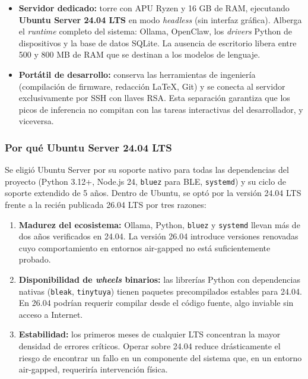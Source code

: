 \begin{itemize}
    \item \textbf{Servidor dedicado:} torre con APU Ryzen y 16 GB de RAM, ejecutando \textbf{Ubuntu Server 24.04 LTS} en modo \textit{headless} (sin interfaz gráfica). Alberga el \textit{runtime} completo del sistema: Ollama, OpenClaw, los \textit{drivers} Python de dispositivos y la base de datos SQLite. La ausencia de escritorio libera entre 500 y 800 MB de RAM que se destinan a los modelos de lenguaje.
    \item \textbf{Portátil de desarrollo:} conserva las herramientas de ingeniería (compilación de firmware, redacción \LaTeX, Git) y se conecta al servidor exclusivamente por SSH con llaves RSA. Esta separación garantiza que los picos de inferencia no compitan con las tareas interactivas del desarrollador, y viceversa.
\end{itemize}

\subsubsection{Por qué Ubuntu Server 24.04 LTS}

Se eligió Ubuntu Server por su soporte nativo para todas las dependencias del proyecto (Python 3.12+, Node.js 24, \texttt{bluez} para BLE, \texttt{systemd}) y su ciclo de soporte extendido de 5 años. Dentro de Ubuntu, se optó por la versión 24.04 LTS frente a la recién publicada 26.04 LTS por tres razones:

\begin{enumerate}
    \item \textbf{Madurez del ecosistema:} Ollama, Python, \texttt{bluez} y \texttt{systemd} llevan más de dos años verificados en 24.04. La versión 26.04 introduce versiones renovadas cuyo comportamiento en entornos air-gapped no está suficientemente probado.
    \item \textbf{Disponibilidad de \textit{wheels} binarios:} las librerías Python con dependencias nativas (\texttt{bleak}, \texttt{tinytuya}) tienen paquetes precompilados estables para 24.04. En 26.04 podrían requerir compilar desde el código fuente, algo inviable sin acceso a Internet.
    \item \textbf{Estabilidad:} los primeros meses de cualquier LTS concentran la mayor densidad de errores críticos. Operar sobre 24.04 reduce drásticamente el riesgo de encontrar un fallo en un componente del sistema que, en un entorno air-gapped, requeriría intervención física.
\end{enumerate}

